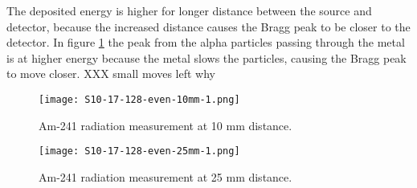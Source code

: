 \documentclass[../main/thesis.tex]{subfiles}
\begin{document}
The deposited energy is higher for longer distance between the source and detector, because the increased distance causes the Bragg peak to be closer to the detector. In figure \ref{fig-3dmimic-am-17-128-10} the peak from the alpha particles passing through the metal is at higher energy because the metal slows the particles, causing the Bragg peak to move closer. 
XXX small moves left why

\begin{figure}[p]
	\centering
	\texttt{[image: S10-17-128-even-10mm-1.png]}
	\caption{Am-241 radiation measurement at 10 mm distance.}
	\label{fig-3dmimic-am-17-128-10}
\end{figure}

\begin{figure}[p]
	\centering
	\texttt{[image: S10-17-128-even-25mm-1.png]}
	\caption{Am-241 radiation measurement at 25 mm distance.}
	\label{fig-3dmimic-am-17-128-25}
\end{figure}
\end{document}
